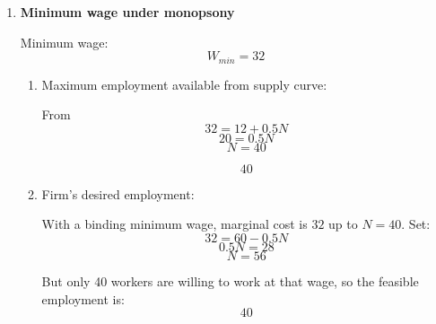 \documentclass[12pt]{article}
\begin{document}
\begin{enumerate}
\begin{enumerate}[label=(\alph*)]
    \item Monopsony employment:

    Set
    \[
    MCL=MRP_N
    \]
    \[
    12+N=60-0.5N
    \]
    \[
    1.5N=48
    \]
    \[
    N=32
    \]

    \[
    \boxed{N_M=32}
    \]

    \item Monopsony wage:

    Substitute into supply:
    \[
    W=12+0.5(32)=12+16=28
    \]

    \[
    \boxed{W_M=28}
    \]

    \item Competitive outcome:

    Under competition:
    \[
    W=MRP_N
    \]
    so
    \[
    12+0.5N=60-0.5N
    \]
    \[
    N=48
    \]
    Wage:
    \[
    W=12+0.5(48)=36
    \]

    \[
    \boxed{N_C=48,\quad W_C=36}
    \]

    \item Comparison:

    Monopsony leads to:
    \[
    N_M=32<48=N_C
    \]
    \[
    W_M=28<36=W_C
    \]

    So employment and wages are both lower under monopsony.
\end{enumerate}


\item \textbf{Minimum wage under monopsony}

Minimum wage:
\[
W_{min}=32
\]

\begin{enumerate}[label=(\alph*)]
    \item Maximum employment available from supply curve:

    From
    \[
    32=12+0.5N
    \]
    \[
    20=0.5N
    \]
    \[
    N=40
    \]

    \[
    \boxed{40}
    \]

    \item Firm's desired employment:

    With a binding minimum wage, marginal cost is \(32\) up to \(N=40\). Set:
    \[
    32=60-0.5N
    \]
    \[
    0.5N=28
    \]
    \[
    N=56
    \]

    But only 40 workers are willing to work at that wage, so the feasible employment is:
    \[
    \boxed{40}
    \]


\end{enumerate}
\end{enumerate}
\end{document}

